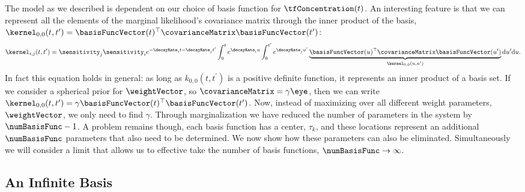 \documentclass{article}
\begin{document}
The model as we described is dependent on our choice of basis function
for $\tfConcentration(t)$. An interesting feature is that we can
represent all the elements of the marginal likelihood's covariance matrix through
the inner product of the basis, $\kernel_{0,0}(t,
t^\prime)=\basisFuncVector(t)^\top\covarianceMatrix\basisFuncVector(t^\prime)$:
\[
\kernel_{i,j}(t,t^\prime) = \sensitivity_j\sensitivity_i e^{-\decayRate_{i}t-\decayRate_{j}t^\prime}\int_0^t
e^{\decayRate_{i}u} \int_0^{t^\prime} e^{\decayRate_{j}u^\prime}\underbrace{\basisFuncVector(u)^\top \covarianceMatrix \basisFuncVector(u^\prime)}_{\kernel_{0,0}(u, u^\prime)}\mathrm{d}u^\prime \mathrm{d}u. \label{eq:convolution}
\]
In fact this equation holds in general: as long as $k_{0,0}(t,
t^\prime)$ is a positive definite function, it represents an inner
product of a basis set. If we consider a spherical prior for
$\weightVector$, so $\covarianceMatrix=\gamma\eye$, then we can write
$\kernel_{0,0}(t,t^\prime) = \gamma
\basisFuncVector(t)^\top\basisFuncVector(t^\prime)$. Now, instead of maximizing
over all different weight parameters, $\weightVector$, we only need to
find $\gamma$. Through marginalization we have reduced the number of
parameters in the system by $\numBasisFunc-1$. A problem remains
though, each basis function has a center, $\tau_k$, and these
locations represent an additional $\numBasisFunc$ parameters that also
need to be determined. We now show how these parameters can also be
eliminated. Simultaneously we will consider a limit that allows us to effective take the number of basis functions, $\numBasisFunc\rightarrow\infty$.

\subsection{An Infinite Basis}
\end{document}
